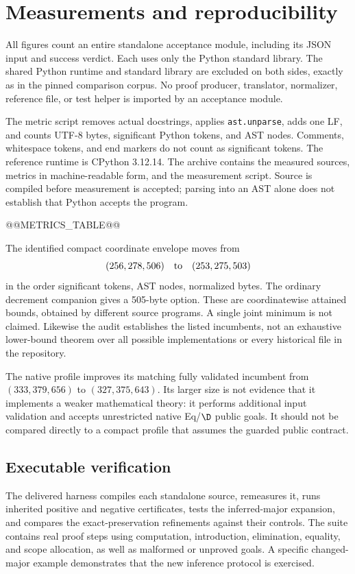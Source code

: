 \section{Measurements and reproducibility}
\label{sec:measurements}

All figures count an entire standalone acceptance module, including its
JSON input and success verdict. Each uses only the Python standard
library. The shared Python runtime and standard library are excluded on
both sides, exactly as in the pinned comparison corpus. No proof producer,
translator, normalizer, reference file, or test helper is imported by an
acceptance module.

The metric script removes actual docstrings, applies \texttt{ast.unparse},
adds one LF, and counts UTF-8 bytes, significant Python tokens, and AST
nodes. Comments, whitespace tokens, and end markers do not count as
significant tokens. The reference runtime is CPython 3.12.14. The archive
contains the measured sources, metrics in machine-readable form, and the
measurement script. Source is compiled before measurement is accepted;
parsing into an AST alone does not establish that Python accepts the
program.

@@METRICS_TABLE@@

The identified compact coordinate envelope moves from
\[
      (256,278,506)\quad\hbox{to}\quad(253,275,503)
\]
in the order significant tokens, AST nodes, normalized bytes. The ordinary
decrement companion gives a 505-byte option. These are coordinatewise
attained bounds, obtained by different source programs. A single joint
minimum is not claimed. Likewise the audit establishes the listed
incumbents, not an exhaustive lower-bound theorem over all possible
implementations or every historical file in the repository.

The native profile improves its matching fully validated incumbent from
$(333,379,656)$ to $(327,375,643)$. Its larger size is not evidence that
it implements a weaker mathematical theory: it performs additional
input validation and accepts unrestricted native Eq/$\D$ public goals.
It should not be compared directly to a compact profile that assumes the
guarded public contract.

\subsection{Executable verification}

The delivered harness compiles each standalone source, remeasures it,
runs inherited positive and negative certificates, tests the inferred-major
expansion, and compares the exact-preservation refinements against their
controls. The suite contains real proof steps using computation,
introduction, elimination, equality, and scope allocation, as well as
malformed or unproved goals. A specific changed-major example demonstrates
that the new inference protocol is exercised.

